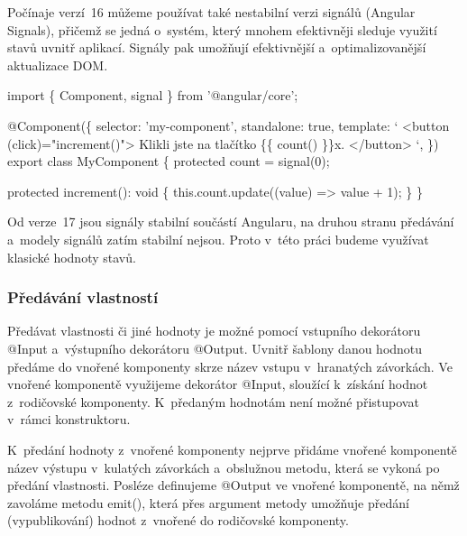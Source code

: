 Počínaje verzí~16 můžeme používat také nestabilní verzi signálů (Angular Signals), přičemž se jedná o~systém, který mnohem efektivněji sleduje využití stavů uvnitř aplikací. 
Signály pak umožňují efektivnější a~optimalizovanější aktualizace DOM. 

\begin{prog}
import \{ Component, signal \} from '@angular/core';

@Component(\{
  selector: 'my-component',
  standalone: true,
  template: `
    <button (click)="increment()">
      Klikli jste na tlačítko \{\{ count() \}\}x.
    </button>
  `,
\})
export class MyComponent \{
  protected count = signal(0);

  protected increment(): void \{
    this.count.update((value) => value + 1);
  \}
\}
\end{prog}

Od verze~17 jsou signály stabilní součástí Angularu, na druhou stranu předávání a~modely signálů zatím stabilní nejsou. 
Proto v~této práci budeme využívat klasické hodnoty stavů.\cite{angulardev}

\subsubsection{Předávání vlastností}

Předávat vlastnosti či jiné hodnoty je možné pomocí vstupního dekorátoru @Input a~výstupního dekorátoru @Output. 
Uvnitř šablony danou hodnotu předáme do vnořené komponenty skrze název vstupu v~hranatých závorkách.   
Ve vnořené komponentě využijeme dekorátor @Input, sloužící k~získání hodnot z~rodičovské komponenty. K~předaným hodnotám není možné přistupovat v~rámci konstruktoru. 

K~předání hodnoty z~vnořené komponenty nejprve přidáme vnořené komponentě název výstupu v~kulatých závorkách a~obslužnou metodu, která se vykoná po předání vlastnosti. 
Posléze definujeme @Output ve vnořené komponentě, na němž zavoláme metodu emit(), která přes argument metody umožňuje předání (vypublikování) hodnot z~vnořené do rodičovské komponenty.\cite{angulardev,learningangular}

